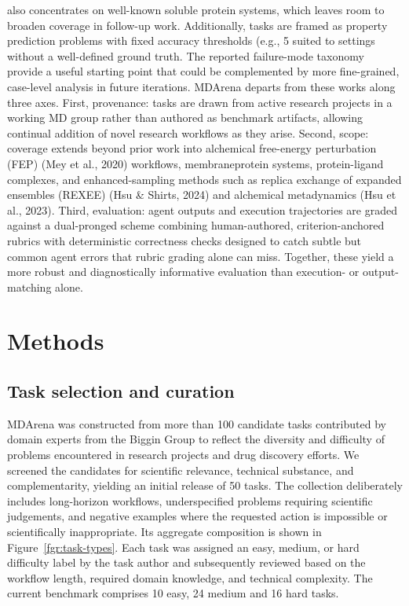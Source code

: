 also concentrates on well-known soluble protein systems, which leaves room to broaden coverage in
follow-up work. Additionally, tasks are framed as property prediction problems with fixed accuracy
thresholds (e.g., 5%
suited to settings without a well-defined ground truth. The reported failure-mode taxonomy provide a
useful starting point that could be complemented by more fine-grained, case-level analysis in future
iterations.
MDArena departs from these works along three axes. First, provenance: tasks are drawn from
active research projects in a working MD group rather than authored as benchmark artifacts, allowing
continual addition of novel research workflows as they arise. Second, scope: coverage extends beyond
prior work into alchemical free-energy perturbation (FEP) (Mey et al., 2020) workflows, membraneprotein systems, protein-ligand complexes, and enhanced-sampling methods such as replica exchange
of expanded ensembles (REXEE) (Hsu & Shirts, 2024) and alchemical metadynamics (Hsu et al.,
2023). Third, evaluation: agent outputs and execution trajectories are graded against a dual-pronged
scheme combining human-authored, criterion-anchored rubrics with deterministic correctness checks
designed to catch subtle but common agent errors that rubric grading alone can miss. Together, these
yield a more robust and diagnostically informative evaluation than execution- or output-matching
alone.









\section{Methods}

\subsection{Task selection and curation}

MDArena was constructed from more than 100 candidate tasks contributed by domain experts from the Biggin Group to reflect the diversity and difficulty of problems encountered in research projects and drug discovery efforts. We screened the candidates for scientific relevance, technical substance, and complementarity, yielding an initial release of 50 tasks. The collection deliberately includes long-horizon workflows, underspecified problems requiring scientific judgements, and negative examples where the requested action is impossible or scientifically inappropriate. Its aggregate composition is shown in Figure~\ref{fgr:task-types}. Each task was assigned an easy, medium, or hard difficulty label by the task author and subsequently reviewed based on the workflow length, required domain knowledge, and technical complexity. The current benchmark comprises 10 easy, 24 medium and 16 hard tasks.


